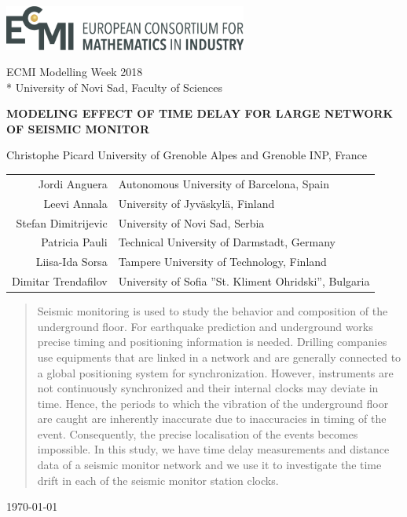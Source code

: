 \documentclass[12pt, sumlimits, intlimits]{article}
\begin{document}
\includegraphics[width=8cm]{../figures/ecmi-logo.png}

ECMI Modelling Week 2018 \\*
University of Novi Sad, Faculty of Sciences

\begin{center}
\vspace{2.0cm}
{\Large{\textbf{\MakeUppercase{Modeling effect of time delay for large network of seismic monitor}}}}


Christophe Picard University of Grenoble Alpes and Grenoble INP, France

\begin{tabular}{rl}
Jordi Anguera & Autonomous University of Barcelona, Spain \\
Leevi Annala & University of Jyväskylä, Finland \\
Stefan Dimitrijevic & University of Novi Sad, Serbia \\
Patricia Pauli & Technical University of Darmstadt, Germany \\
Liisa-Ida Sorsa & Tampere University of Technology, Finland \\ 
Dimitar Trendafilov & University of Sofia ''St. Kliment Ohridski'', Bulgaria

\end{tabular}

\begin{abstract}
	Seismic monitoring is used to study the behavior and composition of the underground floor. For earthquake prediction and underground works precise timing and positioning information is needed. Drilling companies use equipments that are linked in a network and are generally connected to a global positioning system for synchronization. However, instruments are not continuously  synchronized and their internal clocks may deviate in time. Hence, the periods to which the vibration of the underground floor are caught are inherently inaccurate due to inaccuracies in timing of the event. Consequently, the precise localisation of the events becomes impossible. In this study, we have time delay measurements and distance data of a seismic monitor network and we use it to investigate the time drift in each of the seismic monitor station clocks.
	
\end{abstract}


\today

\end{center}
\end{document}
